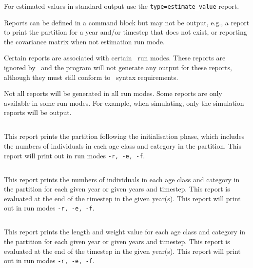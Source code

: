 For estimated values in standard output use the \texttt{type=estimate\_value} report.

Reports can be defined in a  command block but may not be output, e.g., a report to print the partition for a year and/or timestep that does not exist, or reporting the covariance matrix when not estimation run mode.

Certain reports are associated with certain \CNAME\ run modes. These reports are ignored by \CNAME\ and the program will not generate any output for these reports, although they must still conform to \CNAME\ syntax requirements.

Not all reports will be generated in all run modes. Some reports are only available in some run modes. For example, when simulating, only the simulation reports will be output.

\subsection{}

This report prints the partition following the initialisation phase, which includes the numbers of individuals in each age class and category in the partition. This report will print out in run modes \texttt{-r, -e, -f}.

\subsection{}

This report prints the numbers of individuals in each age class and category in the partition for each given year or given years and timestep. This report is evaluated at the end of the timestep in the given year(s). This report will print out in run modes \texttt{-r, -e, -f}.

\subsection{}

This report prints the length and weight value for each age class and category in the partition for each given year or given years and timestep. This report is evaluated at the end of the timestep in the given year(s). This report will print out in run modes \texttt{-r, -e, -f}.


